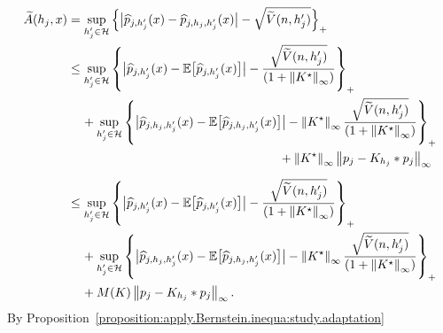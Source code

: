 \documentclass[11pt,a4paper,openany]{article}
\def\E{\mathbb{E}}
\begin{document}
	\begin{align} 
		\widetilde A(h_{j} , x) 
		&= \sup_{h_{j}' \in \mathcal{H}}  \Big\{ \big| \widehat{p}_{j,h_{j}'}(x)  -  \widehat{p}_{j, h_{j} ,h_{j}'}(x) \big| -   \sqrt{\widetilde{V}(n,h_{j}')} \Big\}_{+}   \nonumber
		\\
		&\leq  \sup_{h_{j}' \in \mathcal{H}}  \left\{\big| \widehat{p}_{j,h_{j}'}(x)  -  \E \big[ \widehat{p}_{j,h_{j}'}(x) \big]  \big|  -   \dfrac{\sqrt{\widetilde{V}(n,h_{j}')}}{ (1 +  \left\| K ^{\star} \right\|_{\infty}  ) }  \right\}_{+}
		\nonumber   
		\\
		&\hspace{0.4cm}  +  \sup_{h_{j}' \in \mathcal{H}}  \left\{\big| \widehat{p}_{j, h_{j} ,h_{j}'}(x) - \E \big[ \widehat{p}_{j, h_{j} ,h_{j}'}(x) \big] \big|  -   \left\| K ^{\star} \right\|_{\infty}    \dfrac{\sqrt{\widetilde{V}(n,h_{j}')}}{ (1 +  \left\| K ^{\star} \right\|_{\infty} ) }  \right\}_{+}
		\nonumber
		\\
		& \hspace{6cm} +   \left\| K ^{\star} \right\|_{\infty}  \left\|p_{j} - K_{h_{j}}*p_{j}\right\|_{\infty}    \nonumber
		\\[0.2cm]  
		&\leq  \sup_{h_{j}' \in \mathcal{H}}  \left\{\big| \widehat{p}_{j,h_{j}'}(x)  -  \E \big[ \widehat{p}_{j,h_{j}'}(x) \big]  \big|  -   \dfrac{\sqrt{\widetilde{V}(n,h_{j}')}}{ (1 +  \left\| K ^{\star} \right\|_{\infty}  ) }  \right\}_{+}   
		\label{adaptive:thm:upper-bound.high-Proba:p2:proof:inequality2}
		\\
		&\hspace{0.4cm}  +  \sup_{h_{j}' \in \mathcal{H}}  \left\{\big| \widehat{p}_{j, h_{j} ,h_{j}'}(x) - \E \big[ \widehat{p}_{j, h_{j} ,h_{j}'}(x) \big] \big|  -   \left\| K ^{\star} \right\|_{\infty}    \dfrac{\sqrt{\widetilde{V}(n,h_{j}')}}{ (1 +  \left\| K ^{\star} \right\|_{\infty} ) }  \right\}_{+}    
		\nonumber
		\\
		&\hspace{0.4cm}  +   M(K) %
		\left\| p_{j} - K_{h_{j}} \ast  p_{j}   \right\|_{\infty}.   
		\nonumber
	\end{align}
By  Proposition~\ref{proposition:apply.Bernstein.inequa:study.adaptation}%
	
\end{document}
